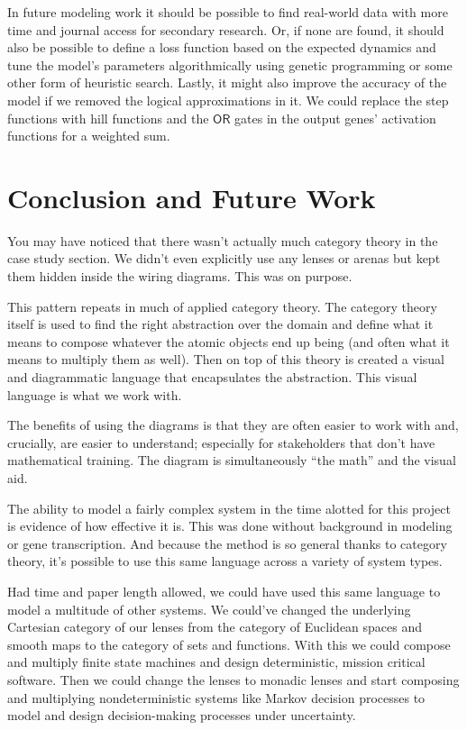 \documentclass[12pt]{article}
\begin{document}
In future modeling work it should be possible to find real-world data with more time and journal access for secondary research.
Or, if none are found, it should also be possible to define a loss function based on the expected dynamics and tune the model's parameters algorithmically using genetic programming or some other form of heuristic search.
Lastly, it might also improve the accuracy of the model if we removed the logical approximations in it.
We could replace the step functions with hill functions and the $\mathsf{OR}$ gates in the output genes' activation functions for a weighted sum.




\section*{Conclusion and Future Work}
You may have noticed that there wasn't actually much category theory in the case study section.
We didn't even explicitly use any lenses or arenas but kept them hidden inside the wiring diagrams.
This was on purpose.

This pattern repeats in much of applied category theory.
The category theory itself is used to find the right abstraction over the domain and define what it means to compose whatever the atomic objects end up being (and often what it means to multiply them as well).
Then on top of this theory is created a visual and diagrammatic language that encapsulates the abstraction.
This visual language is what we work with.

The benefits of using the diagrams is that they are often easier to work with and, crucially, are easier to understand; especially for stakeholders that don't have mathematical training.
The diagram is simultaneously ``the math'' and the visual aid.


The ability to model a fairly complex system in the time alotted for this project is evidence of how effective it is.
This was done without background in modeling or gene transcription.
And because the method is so general thanks to category theory, it's possible to use this same language across a variety of system types.

Had time and paper length allowed, we could have used this same language to model a multitude of other systems.
We could've changed the underlying Cartesian category of our lenses from the category of Euclidean spaces and smooth maps to the category of sets and functions.
With this we could compose and multiply finite state machines and design deterministic, mission critical software.
Then we could change the lenses to monadic lenses and start composing and multiplying nondeterministic systems like Markov decision processes to model and design decision-making processes under uncertainty.
\end{document}
